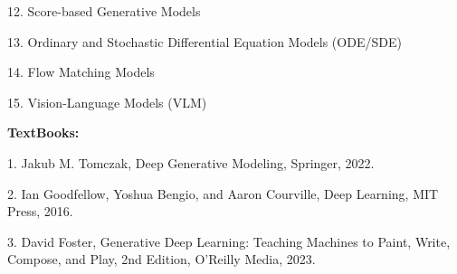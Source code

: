 \documentclass[12pt,a4paper]{article}
\begin{document}
12. Score-based Generative Models\par
13. Ordinary and Stochastic Differential Equation Models (ODE/SDE)\par
14. Flow Matching Models\par
15. Vision-Language Models (VLM)\par\vspace{4pt}
\textbf{TextBooks:}\par\vspace{2pt}
1. Jakub M. Tomczak, Deep Generative Modeling, Springer, 2022.\par
2. Ian Goodfellow, Yoshua Bengio, and Aaron Courville, Deep Learning, MIT Press, 2016.\par
3. David Foster, Generative Deep Learning: Teaching Machines to Paint, Write, Compose, and Play, 2nd Edition, O'Reilly Media, 2023.\par
\vspace{4pt}
\end{document}
